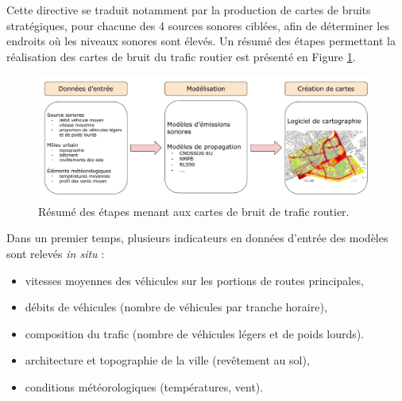Cette directive se traduit notamment par la production de cartes de bruits stratégiques, pour chacune des 4 sources sonores ciblées, afin de déterminer les endroits où les niveaux sonores sont élevés. Un résumé des étapes permettant la réalisation des cartes de bruit du trafic routier est présenté en Figure \ref{fig:cartographie}.\\


\begin{figure}[h]
\centering
\includegraphics[width=.85\linewidth]{./figures/cartographie/cartographie.pdf}
\caption{Résumé des étapes menant aux cartes de bruit de trafic routier.}
\label{fig:cartographie}
\end{figure}

Dans un premier temps, plusieurs indicateurs en données d'entrée des modèles sont relevés \textit{in situ} :  

\begin{itemize}
\item vitesses moyennes des véhicules sur les portions de routes principales,
\item débits de véhicules (nombre de véhicules par tranche horaire),
\item composition du trafic (nombre de véhicules légers et de poids lourds).
\item architecture et topographie de la ville (revêtement au sol), 
\item conditions météorologiques (températures, vent).\\
\end{itemize}

